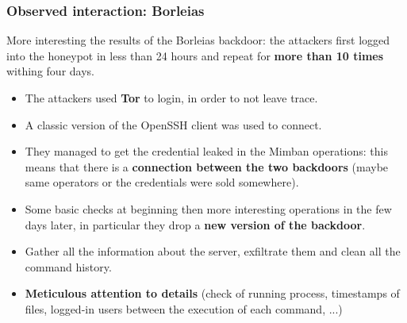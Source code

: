 \begin{frame}
	\frametitle{Observed interaction: Borleias}
	
	More interesting the results of the Borleias backdoor: the attackers first logged into the honeypot in less than 24 hours and repeat for \textbf{more than 10 times} withing four days.
	
	\smallskip
	
	\begin{itemize}
	  \item The attackers used \textbf{Tor} to login, in order to not leave trace.
	  \item A classic version of the OpenSSH client was used to connect.
	  \item They managed to get the credential leaked in the Mimban operations: this means that there is a \textbf{connection between the two backdoors} (maybe same operators or the credentials were sold somewhere).
	  \item Some basic checks at beginning then more interesting operations in the few days later, in particular they drop a \textbf{new version of the backdoor}.
	  \item Gather all the information about the server, exfiltrate them and clean all the command history.
	  \item \textbf{Meticulous attention to details} (check of running process, timestamps of files, logged-in users between the execution of each command, ...)
	\end{itemize} 
	
\end{frame}
